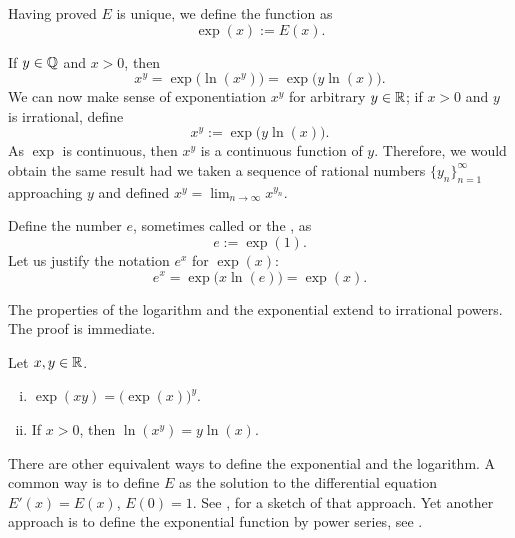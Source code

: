 Having proved $E$ is unique, we define the
\emph{} function as
\begin{equation*}
\exp(x) := E(x) .
\end{equation*}

If $y \in {\mathbb{Q}}$ and $x > 0$, then
\begin{equation*}
x^y = \exp\bigl(\ln(x^y)\bigr) = \exp\bigl(y\ln(x)\bigr) .
\end{equation*}
We can now make sense of exponentiation $x^y$ for arbitrary $y \in {\mathbb{R}}$;
if $x > 0$ and $y$ is irrational, define
\begin{equation*}
x^y := \exp\bigl(y\ln(x)\bigr) .
\end{equation*}
As $\exp$ is continuous, then $x^y$ is a continuous function of $y$.
Therefore, we would
obtain the same result had we taken a sequence of rational numbers
$\{ y_n \}_{n=1}^\infty$
approaching $y$ and defined $x^y = \lim_{n\to\infty} x^{y_n}$.

Define the number $e$,
sometimes called \emph{} or
the \emph{}, as
\begin{equation*}
e := \exp(1) .
\end{equation*}
Let us justify the notation $e^x$ for $\exp(x)$:
\begin{equation*}
e^x = \exp\bigl(x \ln(e) \bigr) = \exp(x) .
\end{equation*}

The properties of the logarithm and the exponential extend to
irrational powers.  The proof is immediate.

\begin{prop}
Let $x, y \in {\mathbb{R}}$.
\begin{enumerate}[(i)]
\item
$\exp(xy) = {\bigl(\exp(x)\bigr)}^y$.
\item
If $x > 0$, then $\ln(x^y) = y \ln (x)$.
\end{enumerate}
\end{prop}

\begin{remark}
There are other equivalent ways to define the exponential and the logarithm.
A common way is to define $E$ as the solution to the differential equation
$E'(x) = E(x)$, $E(0) = 1$.  See ,
for a sketch of that approach.  Yet another
approach is to define the exponential function by
power series, see .
\end{remark}

